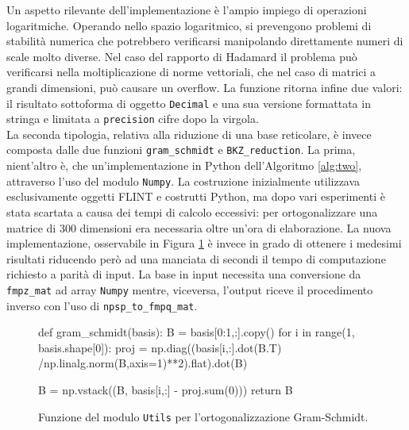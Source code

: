 Un aspetto rilevante dell'implementazione è l'ampio impiego di operazioni logaritmiche.
Operando nello spazio logaritmico, si prevengono problemi di stabilità numerica che 
potrebbero verificarsi manipolando direttamente numeri di scale molto diverse. Nel caso
del rapporto di Hadamard il problema può verificarsi nella moltiplicazione di norme vettoriali,
che nel caso di matrici a grandi dimensioni, può causare un overflow. 
La funzione ritorna infine due valori: il risultato sottoforma di oggetto \texttt{Decimal}
e una sua versione formattata in stringa e limitata a \texttt{precision} cifre dopo la virgola. \\
La seconda tipologia, relativa alla riduzione di una base reticolare, è invece composta
dalle due funzioni \texttt{gram\_schmidt} e \texttt{BKZ\_reduction}. La prima, nient'altro 
è, che un'implementazione in Python dell'Algoritmo \ref{alg:two}, attraverso l'uso del
modulo \texttt{Numpy}. La costruzione inizialmente utilizzava esclusivamente oggetti FLINT 
e costrutti Python, ma dopo vari esperimenti è stata scartata a causa dei tempi di calcolo 
eccessivi: per ortogonalizzare una matrice di 300 dimensioni era necessaria oltre 
un'ora di elaborazione. La nuova implementazione, osservabile in Figura \ref{fig:utils_gram_schmidt}
è invece in grado di ottenere i medesimi risultati riducendo però ad una manciata di 
secondi il tempo di computazione richiesto a parità di input. 
La base in input necessita una conversione da \texttt{fmpz\_mat} ad 
array \texttt{Numpy} mentre, viceversa, l'output riceve il procedimento inverso con l'uso 
di \texttt{npsp\_to\_fmpq\_mat}.

\begin{figure}[H]
    \begin{python}
        def gram_schmidt(basis):
            B = basis[0:1,:].copy()
            for i in range(1, basis.shape[0]):
                proj = np.diag((basis[i,:].dot(B.T)
                        /np.linalg.norm(B,axis=1)**2).flat).dot(B)

                B = np.vstack((B, basis[i,:] - proj.sum(0)))
            return B
    \end{python}
    \caption{Funzione del modulo \texttt{Utils} per l'ortogonalizzazione Gram-Schmidt.}
    \label{fig:utils_gram_schmidt}
\end{figure}

